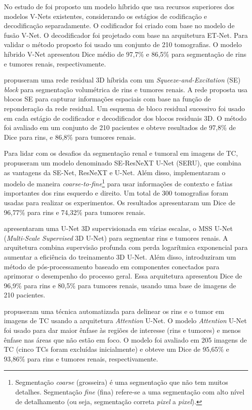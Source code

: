 No estudo de  foi proposto um modelo híbrido que usa recursos superiores dos modelos V-Nets existentes, considerando os estágios de codificação e decodificação separadamente. O codificador foi criado com base no modelo de fusão V-Net. O decodificador foi projetado com base na arquitetura ET-Net. Para validar o método proposto foi usado um conjunto de 210 tomografias. O modelo híbrido V-Net apresentou Dice médio de 97,7\% e 86,5\% para segmentação de rins e tumores renais, respectivamente.

 propuseram uma rede residual 3D híbrida com um \textit{Squeeze-and-Excitation} (SE) \textit{block} para segmentação volumétrica de rins e tumores renais. A rede proposta usa blocos SE para capturar informações espaciais com base na função de reponderação da rede residual. Um esquema de bloco residual sucessivo foi usado em cada estágio de codificador e decodificador dos blocos residuais 3D. O método foi avaliado em um conjunto de 210 pacientes e obteve resultados de 97,8\% de Dice para rins, e 86,8\% para tumores renais.

Para lidar com os desafios da segmentação renal e tumoral em imagens de TC,  propuseram um modelo denominado SE-ResNeXT U-Net (SERU), que combina as vantagens da SE-Net, ResNeXT e U-Net. Além disso, implementaram o modelo de maneira \textit{coarse-to-fine}\footnote{Segmentação \textit{coarse} (grosseira) é uma segmentação que não tem muitos detalhes. Segmentação \textit{fine} (fina) refere-se a uma segmentação com alto nível de detalhamento (ou seja, segmentação correta \textit{pixel} a \textit{pixel}).} para usar informações de contexto e fatias importantes dos rins esquerdo e direito. Um total de 300 tomografias foram usadas para realizar os experimentos. Os resultados apresentaram um Dice de 96,77\% para rins e 74,32\% para tumores renais.

 apresentaram uma U-Net 3D supervisionada em várias escalas, o MSS U-Net (\textit{Multi-Scale Supervised} 3D U-Net) para segmentar rins e tumores renais. A arquitetura combina supervisão profunda com perda logarítmica exponencial para aumentar a eficiência do treinamento 3D U-Net. Além disso, introduziram um método de pós-processamento baseado em componentes conectados para aprimorar o desempenho do processo geral. Essa arquitetura apresentou Dice de 96,9\% para rins e 80,5\% para tumores renais, usando uma base de imagens de 210 pacientes.

 propuseram uma técnica automatizada para delinear os rins e o tumor em imagens de TC usando a arquitetura \textit{Attention} U-Net. O modelo \textit{Attention} U-Net foi usado para dar maior ênfase às regiões de interesse (rins e tumores) e menos ênfase nas áreas que não estão em foco. O modelo foi avaliado em 205 imagens de TC (cinco TCs foram excluídas inicialmente) e obteve um Dice de 95,65\% e 93,86\% para rins e tumores renais, respectivamente. 

